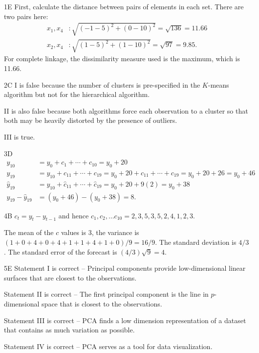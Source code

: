 
\begin{solution}{1}{E}
First, calculate the distance between pairs of elements in each set. There are two pairs here:
\begin{align*}
x_1, x_4 &: \sqrt{(-1-5)^2 + (0-10)^2} = \sqrt{136} = 11.66 \\
x_2, x_4 &: \sqrt{(1-5)^2 + (1-10)^2} = \sqrt{97} = 9.85.
\end{align*}
For complete linkage, the dissimilarity measure used is the maximum, which is 11.66.
\end{solution}

\begin{solution}{2}{C}
I is false because the number of clusters is pre-specified in the $K$-means algorithm but not for the hierarchical algorithm.

II is also false because both algorithms force each observation to a cluster so that both may be heavily distorted by the presence of outliers.

III is true.
\end{solution}

\begin{solution}{3}{D}
\begin{align*}
y_{10} &= y_0 + c_1 + \cdots + c_{10} = y_0 + 20 \\
y_{19} &= y_{10} + c_{11} + \cdots + c_{19} = y_0 + 20 + c_{11} + \cdots + c_{19} = y_0 + 20 + 26 = y_0 + 46 \\
\hat{y}_{19} &= y_{10} + \hat{c}_{11} + \cdots + \hat{c}_{19} = y_0 + 20 + 9(2) = y_0 + 38 \\
y_{19} - \hat{y}_{19} &= (y_0 + 46) - (y_0 + 38) = 8.
\end{align*}
\end{solution}

\begin{solution}{4}{B}
$c_t = y_t - y_{t-1}$ and hence $c_1, c_2, \ldots c_{10} = 2,3,5,3,5,2,4,1,2,3.$

The mean of the $c$ values is 3, the variance is $(1+0+4+0+4+1+1+4+1+0)/9 = 16/9$. The standard deviation is $4/3$. The standard error of the forecast is $(4/3)\sqrt{9} = 4.$
\end{solution}

\begin{solution}{5}{E}
Statement I is correct -- Principal components provide low-dimensional linear surfaces that are closest to the observations.

Statement II is correct -- The first principal component is the line in $p$-dimensional space that is closest to the observations.

Statement III is correct -- PCA finds a low dimension representation of a dataset that contains as much variation as possible.

Statement IV is correct -- PCA serves as a tool for data visualization.
\end{solution}

